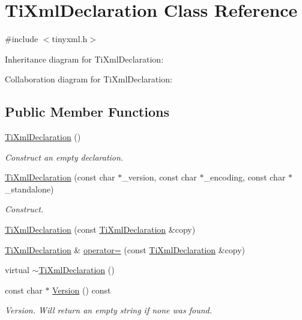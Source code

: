 \hypertarget{class_ti_xml_declaration}{\section{Ti\+Xml\+Declaration Class Reference}
\label{class_ti_xml_declaration}
}


{\ttfamily \#include $<$tinyxml.\+h$>$}



Inheritance diagram for Ti\+Xml\+Declaration\+:


Collaboration diagram for Ti\+Xml\+Declaration\+:
\subsection*{Public Member Functions}
\begin{DoxyCompactItemize}
\item 
\hyperlink{class_ti_xml_declaration_aa0484d059bea0ea1acb47c9094382d79}{Ti\+Xml\+Declaration} ()
\begin{DoxyCompactList}\small\item\em Construct an empty declaration. \end{DoxyCompactList}\item 
\hyperlink{class_ti_xml_declaration_a3b618d1c30c25e4b7a71f31a595ee298}{Ti\+Xml\+Declaration} (const char $\ast$\+\_\+version, const char $\ast$\+\_\+encoding, const char $\ast$\+\_\+standalone)
\begin{DoxyCompactList}\small\item\em Construct. \end{DoxyCompactList}\item 
\hyperlink{class_ti_xml_declaration_a58ac9042c342f7845c8491da0bb091e8}{Ti\+Xml\+Declaration} (const \hyperlink{class_ti_xml_declaration}{Ti\+Xml\+Declaration} \&copy)
\item 
\hyperlink{class_ti_xml_declaration}{Ti\+Xml\+Declaration} \& \hyperlink{class_ti_xml_declaration_a3bc617efe11014ff2b1a9c5727c37a9a}{operator=} (const \hyperlink{class_ti_xml_declaration}{Ti\+Xml\+Declaration} \&copy)
\item 
virtual \hyperlink{class_ti_xml_declaration_ad5f37a673f4c507fd7e550470f9cec25}{$\sim$\+Ti\+Xml\+Declaration} ()
\item 
const char $\ast$ \hyperlink{class_ti_xml_declaration_a02ee557b1a4545c3219ed377c103ec76}{Version} () const 
\begin{DoxyCompactList}\small\item\em Version. Will return an empty string if none was found. \end{DoxyCompactList}\item 

\end{DoxyCompactItemize}
